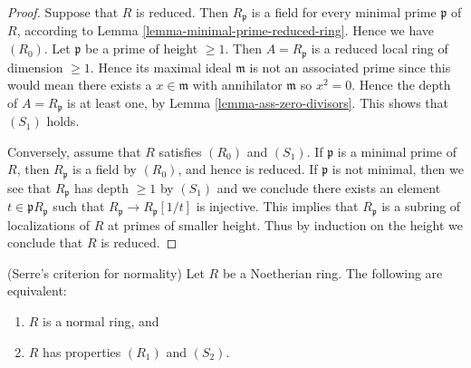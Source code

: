 \begin{proof}
Suppose that $R$ is reduced. Then $R_{\mathfrak p}$ is a field for
every minimal prime $\mathfrak p$ of $R$, according to
Lemma \ref{lemma-minimal-prime-reduced-ring}. Hence we have $(R_0)$.
Let $\mathfrak p$ be a prime of height $\geq 1$. Then $A = R_{\mathfrak p}$
is a reduced local ring of dimension $\geq 1$. Hence its maximal
ideal $\mathfrak m$ is not an associated prime
since this would mean there exists a $x \in \mathfrak m$
with annihilator $\mathfrak m$ so $x^2 = 0$. Hence the depth of
$A = R_{\mathfrak p}$ is at least one, by Lemma \ref{lemma-ass-zero-divisors}.
This shows that $(S_1)$ holds.

\medskip\noindent
Conversely, assume that $R$ satisfies $(R_0)$ and $(S_1)$.
If $\mathfrak p$ is a minimal prime of $R$, then
$R_{\mathfrak p}$ is a field by $(R_0)$, and hence is reduced.
If $\mathfrak p$ is not minimal, then we see that $R_{\mathfrak p}$
has depth $\geq 1$ by $(S_1)$ and we conclude there exists an element
$t \in \mathfrak pR_{\mathfrak p}$ such that
$R_{\mathfrak p} \to R_{\mathfrak p}[1/t]$ is injective.
This implies that $R_{\mathfrak p}$ is a subring of localizations
of $R$ at primes of smaller height. Thus by induction on the height we
conclude that $R$ is reduced.
\end{proof}

\begin{lemma}
\label{lemma-criterion-normal}
(Serre's criterion for normality)
Let $R$ be a Noetherian ring.
The following are equivalent:
\begin{enumerate}
\item $R$ is a normal ring, and
\item $R$ has properties $(R_1)$ and $(S_2)$.
\end{enumerate}
\end{lemma}

